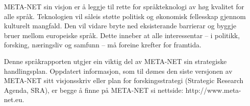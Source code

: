 \begin{multicols}{2}
META-NET sin visjon er å leggje til rette for språkteknologi av høg kvalitet for alle språk. Teknologien vil såleis støtte politisk og økonomisk fellesskap gjennom kulturelt mangfald. Den vil vidare bryte ned eksisterande barrierar og byggje bruer mellom europeiske språk. Dette inneber at alle interessentar -- i politikk, forsking, næringsliv og samfunn -- må foreine krefter for framtida. 

Denne språkrapporten utgjer ein viktig del av META-NET sin strategiske handlingsplan. Oppdatert informasjon, som til dømes den siste versjonen av META-NET sitt visjonsskriv \cite{Meta1} eller plan for forskingsstrategi (Strategic Research Agenda, SRA), er begge å finne på META-NET si nettside: http://www.meta-net.eu.
\end{multicols}

\clearpage


